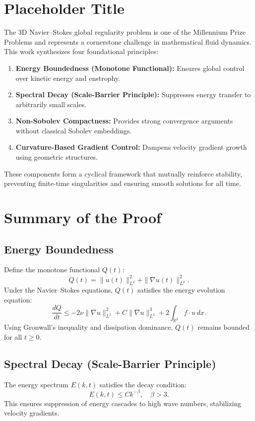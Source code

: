 \section{Placeholder Title}
The 3D Navier--Stokes global regularity problem is one of the Millennium Prize Problems and represents a cornerstone challenge in mathematical fluid dynamics. This work synthesizes four foundational principles:
\begin{enumerate}
    \item \textbf{Energy Boundedness (Monotone Functional):} Ensures global control over kinetic energy and enstrophy.
    \item \textbf{Spectral Decay (Scale-Barrier Principle):} Suppresses energy transfer to arbitrarily small scales.
    \item \textbf{Non-Sobolev Compactness:} Provides strong convergence arguments without classical Sobolev embeddings.
    \item \textbf{Curvature-Based Gradient Control:} Dampens velocity gradient growth using geometric structures.
\end{enumerate}
These components form a cyclical framework that mutually reinforce stability, preventing finite-time singularities and ensuring smooth solutions for all time.

\section{Summary of the Proof}

\subsection{Energy Boundedness}
\begin{theorem}
Define the monotone functional $Q(t)$:
\begin{equation}
Q(t) = \|u(t)\|_{L^2}^2 + \|\nabla u(t)\|_{L^2}^2.
\end{equation}
Under the Navier--Stokes equations, $Q(t)$ satisfies the energy evolution equation:
\begin{equation}
\frac{dQ}{dt} \leq -2\nu \|\nabla u\|_{L^2}^2 + C\|\nabla u\|_{L^2}^3 + 2\int_{\mathbb{R}^3} f \cdot u \, dx.
\end{equation}
Using Gronwall's inequality and dissipation dominance, $Q(t)$ remains bounded for all $t \geq 0$.
\end{theorem}

\subsection{Spectral Decay (Scale-Barrier Principle)}
\begin{theorem}
The energy spectrum $E(k, t)$ satisfies the decay condition:
\begin{equation}
E(k, t) \leq Ck^{-\beta}, \quad \beta > 3.
\end{equation}
This ensures suppression of energy cascades to high wave numbers, stabilizing velocity gradients.
\end{theorem}


